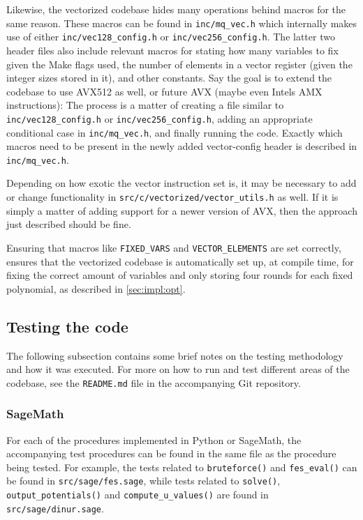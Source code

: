 Likewise, the vectorized codebase hides many operations behind macros for the same reason. These macros can be found in \texttt{inc/mq\_vec.h} which internally makes use of either \texttt{inc/vec128\_config.h} or \texttt{inc/vec256\_config.h}. The latter two header files also include relevant macros for stating how many variables to fix given the Make flags used, the number of elements in a vector register (given the integer sizes stored in it), and other constants. Say the goal is to extend the codebase to use AVX512 as well, or future AVX (maybe even Intels AMX instructions): The process is a matter of creating a file similar to \texttt{inc/vec128\_config.h} or \texttt{inc/vec256\_config.h}, adding an appropriate conditional case in \texttt{inc/mq\_vec.h}, and finally running the code. Exactly which macros need to be present in the newly added vector-config header is described in \texttt{inc/mq\_vec.h}. 

Depending on how exotic the vector instruction set is, it may be necessary to add or change functionality in \texttt{src/c/vectorized/vector\_utils.h} as well. If it is simply a matter of adding support for a newer version of AVX, then the approach just described should be fine.

Ensuring that macros like \texttt{FIXED\_VARS} and \texttt{VECTOR\_ELEMENTS} are set correctly, ensures that the vectorized codebase is automatically set up, at compile time, for fixing the correct amount of variables and only storing four rounds for each fixed polynomial, as described in \cref{sec:impl:opt}.

\subsection{Testing the code}
The following subsection contains some brief notes on the testing methodology and how it was executed. For more on how to run and test different areas of the codebase, see the \texttt{README.md} file in the accompanying Git repository.

\subsubsection{SageMath}

For each of the procedures implemented in Python or SageMath, the accompanying test procedures can be found in the same file as the procedure being tested. For example, the tests related to \texttt{bruteforce()} and \texttt{fes\_eval()} can be found in \texttt{src/sage/fes.sage}, while tests related to \texttt{solve()}, \texttt{output\_potentials()} and \texttt{compute\_u\_values()} are found in \texttt{src/sage/dinur.sage}.

